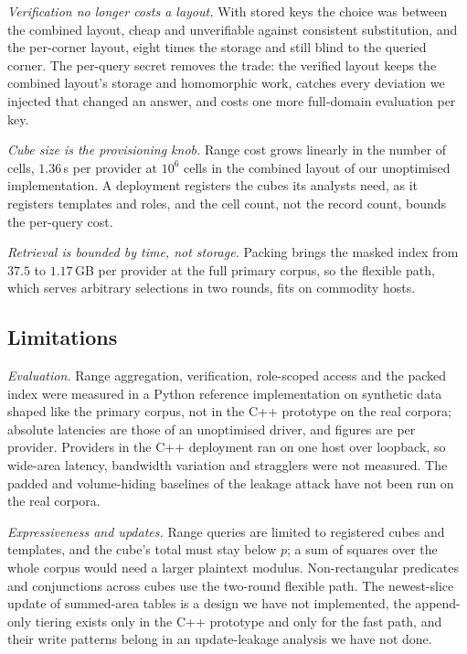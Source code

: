 \documentclass[a4paper,fleqn]{cas-sc}
\newif\ifauthorchecks
\newcommand{\authorcheck}[1]{\ifauthorchecks{\color{red}\textsf{[Authors: #1]}}\fi}
\begin{document}
\emph{Verification no longer costs a layout.} With stored keys the choice was
between the combined layout, cheap and unverifiable against consistent
substitution, and the per-corner layout, eight times the storage and still
blind to the queried corner. The per-query secret removes the trade: the
verified layout keeps the combined layout's storage and homomorphic work,
catches every deviation we injected that changed an answer, and costs one more
full-domain evaluation per key.

\emph{Cube size is the provisioning knob.} Range cost grows linearly in the
number of cells, $1.36$\,s per provider at $10^6$ cells in the combined layout
of our unoptimised implementation. A deployment registers the cubes its
analysts need, as it registers templates and roles, and the cell count, not the
record count, bounds the per-query cost.

\emph{Retrieval is bounded by time, not storage.} Packing brings the masked
index from $37.5$ to $1.17$\,GB per provider at the full primary corpus, so the
flexible path, which serves arbitrary selections in two rounds, fits on
commodity hosts.

\subsection{Limitations}
\label{sec:limits}
\emph{Evaluation.} Range aggregation, verification, role-scoped access and the
packed index were measured in a Python reference implementation on synthetic
data shaped like the primary corpus, not in the C++ prototype on the real
corpora; absolute latencies are those of an unoptimised driver, and figures
are per provider. Providers in the C++ deployment ran on one host over
loopback, so wide-area latency, bandwidth variation and stragglers were not
measured. The padded and volume-hiding baselines of the leakage attack have
not been run on the real corpora. \authorcheck{Port range aggregation and the
session check to the C++ build, measure them on both real corpora, run the
padded leakage baselines, and deploy providers in at least two cloud regions.}

\emph{Expressiveness and updates.} Range queries are limited to registered
cubes and templates, and the cube's total must stay below $p$; a sum of squares
over the whole corpus would need a larger plaintext modulus. Non-rectangular
predicates and conjunctions across cubes use the two-round flexible path. The
newest-slice update of summed-area tables is a design we have not implemented,
the append-only tiering exists only in the C++ prototype and only for the fast
path, and their write patterns belong in an update-leakage analysis we have not
done.
\end{document}
